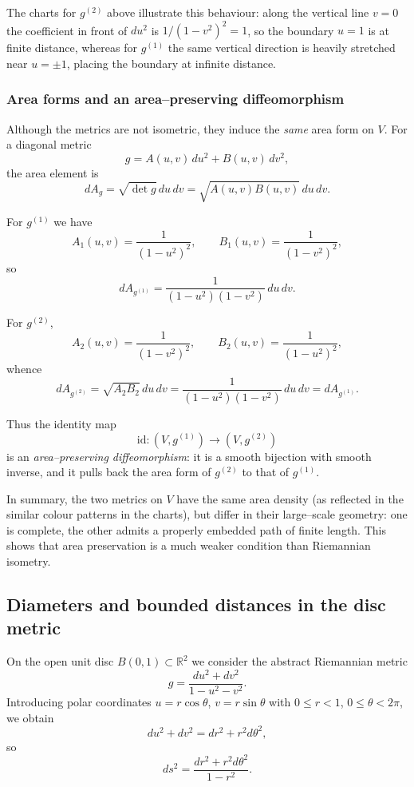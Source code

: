 \documentclass[12pt,a4paper]{article}
\theoremstyle{plain}
\theoremstyle{definition}      %
\begin{document}
	The charts for $g^{(2)}$ above illustrate this behaviour: along the vertical
	line $v=0$ the coefficient in front of $du^2$ is $1/(1-v^2)^2=1$, so the
	boundary $u=1$ is at finite distance, whereas for $g^{(1)}$ the same
	vertical direction is heavily stretched near $u=\pm1$, placing the boundary
	at infinite distance.
	
	\subsubsection*{Area forms and an area--preserving diffeomorphism}
	
	Although the metrics are not isometric, they induce the \emph{same} area
	form on $V$.  For a diagonal metric
	\[
	g = A(u,v)\,du^2 + B(u,v)\,dv^2,
	\]
	the area element is
	\[
	dA_g = \sqrt{\det g}\,du\,dv
	= \sqrt{A(u,v)B(u,v)}\,du\,dv.
	\]
	
	For $g^{(1)}$ we have
	\[
	A_1(u,v) = \frac{1}{(1-u^2)^2},\qquad
	B_1(u,v) = \frac{1}{(1-v^2)^2},
	\]
	so
	\[
	dA_{g^{(1)}} = \frac{1}{(1-u^2)(1-v^2)}\,du\,dv.
	\]
	
	For $g^{(2)}$,
	\[
	A_2(u,v) = \frac{1}{(1-v^2)^2},\qquad
	B_2(u,v) = \frac{1}{(1-u^2)^2},
	\]
	whence
	\[
	dA_{g^{(2)}}
	= \sqrt{A_2 B_2}\,du\,dv
	= \frac{1}{(1-u^2)(1-v^2)}\,du\,dv
	= dA_{g^{(1)}}.
	\]
	
	Thus the identity map
	\[
	\mathrm{id} : (V,g^{(1)}) \longrightarrow (V,g^{(2)})
	\]
	is an \emph{area--preserving diffeomorphism}: it is a smooth bijection with
	smooth inverse, and it pulls back the area form of $g^{(2)}$ to that of
	$g^{(1)}$.
	
	In summary, the two metrics on $V$ have the same area density (as reflected
	in the similar colour patterns in the charts), but differ in their
	large–scale geometry: one is complete, the other admits a properly embedded
	path of finite length.  This shows that area preservation is a much weaker
	condition than Riemannian isometry.
	
	\subsection*{Diameters and bounded distances in the disc metric}
	
	On the open unit disc $B(0,1)\subset\mathbb{R}^2$ we consider the abstract
	Riemannian metric
	\[
	g = \frac{du^2 + dv^2}{1-u^2-v^2}.
	\]
	Introducing polar coordinates $u = r\cos\theta$, $v = r\sin\theta$ with
	$0\le r<1$, $0\le\theta<2\pi$, we obtain
	\[
	du^2 + dv^2 = dr^2 + r^2 d\theta^2,
	\]
	so
	\[
	ds^2
	= \frac{dr^2 + r^2 d\theta^2}{1-r^2}.
	\]
	
\end{document}
